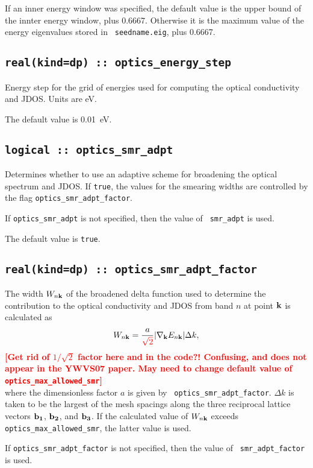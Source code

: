 If an inner energy window was specified, the default value is the
upper bound of the innter energy window, plus 0.6667.  Otherwise it is
the maximum value of the energy eigenvalues stored in {\tt
  seedname.eig}, plus 0.6667.

\subsection[optics\_energy\_step]{\tt real(kind=dp) :: optics\_energy\_step}
Energy step for the grid of energies used for computing the optical
conductivity and JDOS. Units are eV.

The default value is 0.01~eV.


\subsection[optics\_smr\_adpt]{\tt logical :: optics\_smr\_adpt}
Determines whether to use an adaptive scheme for broadening the
optical spectrum and JDOS. If \verb#true#, the values for the smearing widths are 
controlled by the flag {\tt optics\_smr\_adpt\_factor}.

If {\tt optics\_smr\_adpt} is not specified, then the value of {\tt
  smr\_adpt} is used.  

The default value is \verb#true#.


\subsection[optics\_smr\_adpt\_factor]{\tt real(kind=dp) ::
  optics\_smr\_adpt\_factor}

The width $W_{n{\bf k}}$ of the broadened delta function used to
determine the contribution to the optical conductivity and JDOS from
band $n$ at point ${\bf k}$ is calculated as
%
$$
W_{n{\bf k}}=\frac{a}{\textcolor{red}{\sqrt{2}}}\vert
\nabla_{\bf k} E_{n{\bf k}}\vert \Delta k,
$$ 
%
\textcolor{red}{{\bf [Get rid of $1/\sqrt{2}$ factor here and in the code?! 
Confusing, and does not appear in the YWVS07 paper. May need to change default value of
{\tt optics\_max\_allowed\_smr}]}}\\
where the dimensionless factor $a$ is given by {\tt
  optics\_smr\_adpt\_factor}. $\Delta k$ is taken to be the largest of
the mesh spacings along the three reciprocal lattice vectors ${\bf
  b_1}$, ${\bf b_2}$, and ${\bf b_3}$.  If the calculated value of
$W_{n{\bf k}}$ exceeds {\tt optics\_max\_allowed\_smr}, the latter
value is used.

If {\tt optics\_smr\_adpt\_factor} is not specified, then the value of {\tt
  smr\_adpt\_factor} is used.  

